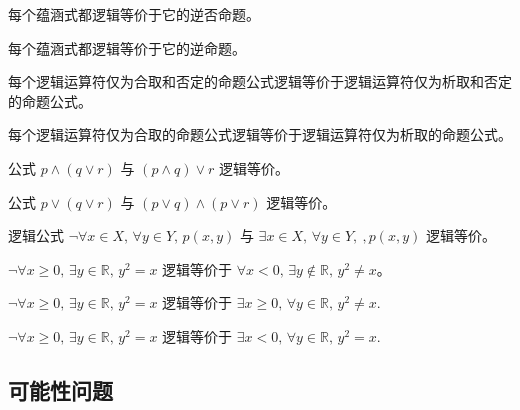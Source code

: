 
\begin{chapex} %
\label{cqLogicTFBegin}
每个蕴涵式都逻辑等价于它的逆否命题。
\end{chapex}

\begin{chapex} %
每个蕴涵式都逻辑等价于它的逆命题。
\end{chapex}

\begin{chapex} %
每个逻辑运算符仅为合取和否定的命题公式逻辑等价于逻辑运算符仅为析取和否定的命题公式。
\end{chapex}

\begin{chapex} %
每个逻辑运算符仅为合取的命题公式逻辑等价于逻辑运算符仅为析取的命题公式。
\end{chapex}

\begin{chapex} %
公式 $p \wedge (q \vee r)$ 与 $(p \wedge q) \vee r$ 逻辑等价。
\end{chapex}

\begin{chapex} %
公式 $p \vee (q \vee r)$ 与 $(p \vee q) \wedge (p \vee r)$ 逻辑等价。
\end{chapex}

\begin{chapex} %
逻辑公式 $\neg \forall x \in X,\, \forall y \in Y,\, p(x,y)$ 与 $\exists x \in X,\, \forall y \in Y,\ , p(x,y)$ 逻辑等价。
\end{chapex}

\begin{chapex} %
$\neg \forall x \ge 0,\, \exists y \in \mathbb{R},\, y^2=x$ 逻辑等价于 $\forall x < 0,\, \exists y \not\in \mathbb{R},\, y^2 \ne x$。
\end{chapex}

\begin{chapex} %
$\neg \forall x \ge 0,\, \exists y \in \mathbb{R},\, y^2=x$ 逻辑等价于 $\exists x \ge 0,\, \forall y \in \mathbb{R},\, y^2 \ne x$.
\end{chapex}

\begin{chapex} %
\label{cqLogicTFEnd}
$\neg \forall x \ge 0,\, \exists y \in \mathbb{R},\, y^2=x$ 逻辑等价于 $\exists x < 0,\, \forall y \in \mathbb{R},\, y^2 = x$.
\end{chapex}

\subsection*{可能性问题}

